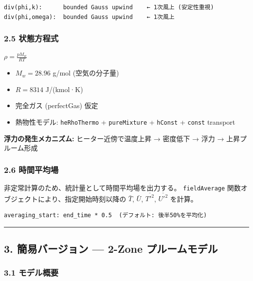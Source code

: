 \documentclass[a4paper,11pt]{article}
\begin{document}
\begin{verbatim}
div(phi,k):      bounded Gauss upwind    ← 1次風上 (安定性重視)
div(phi,omega):  bounded Gauss upwind    ← 1次風上
\end{verbatim}

\subsubsection{2.5 状態方程式}

$
\rho = \frac{p M_w}{R T}
$

\begin{itemize} \item $M_w = 28.96$ g/mol (空気の分子量) \end{itemize}
\begin{itemize} \item $R = 8314$ J/(kmol·K) \end{itemize}
\begin{itemize} \item 完全ガス (perfectGas) 仮定 \end{itemize}
\begin{itemize} \item 熱物性モデル: \texttt{heRhoThermo} + \texttt{pureMixture} + \texttt{hConst} + \texttt{const} transport \end{itemize}

\textbf{浮力の発生メカニズム:}
ヒーター近傍で温度上昇 → 密度低下 → 浮力 → 上昇プルーム形成

\subsubsection{2.6 時間平均場}

非定常計算のため、統計量として時間平均場を出力する。
\texttt{fieldAverage} 関数オブジェクトにより、指定開始時刻以降の
$\bar{T}$, $\bar{U}$, $\overline{T'^2}$, $\overline{U'^2}$ を計算。

\begin{verbatim}
averaging_start: end_time * 0.5  (デフォルト: 後半50%を平均化)
\end{verbatim}

\bigskip\hrule\bigskip

\subsection{3. 簡易バージョン — 2-Zone プルームモデル}

\subsubsection{3.1 モデル概要}
\end{document}
